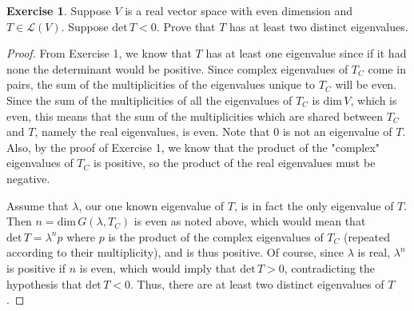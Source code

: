 \documentclass{article}
\theoremstyle{definition}
\newtheorem{ex}{Exercise}
\begin{document}
\begin{ex}
	Suppose $V$ is a real vector space with even dimension and $T \in \mathcal{L}(V)$.
	Suppose $\mathrm{det}\,T < 0$.
	Prove that $T$ has at least two distinct eigenvalues.
\end{ex}
\begin{proof}
	From Exercise 1, we know that $T$ has at least one eigenvalue since if it had none the determinant would be positive.
	Since complex eigenvalues of $T_C$ come in pairs, the sum of the multiplicities of the eigenvalues unique to $T_C$ will be even.
	Since the sum of the multiplicities of all the eigenvalues of $T_C$ is $\mathrm{dim}\,V$, which is even, this means that the sum of the multiplicities which are shared between $T_C$ and $T$, namely the real eigenvalues, is even.
	Note that 0 is not an eigenvalue of $T$.
	Also, by the proof of Exercise 1, we know that the product of the "complex" eigenvalues of $T_C$ is positive, so the product of the real eigenvalues must be negative.

	Assume that $\lambda$, our one known eigenvalue of $T$, is in fact the only eigenvalue of $T$.
	Then $n = \mathrm{dim}\,G(\lambda, T_C)$ is even as noted above, which would mean that $\mathrm{det}\,T = \lambda^np$ where $p$ is the product of the complex eigenvalues of $T_C$ (repeated according to their multiplicity), and is thus positive.
	Of course, since $\lambda$ is real, $\lambda^n$ is positive if $n$ is even, which would imply that $\mathrm{det}\,T > 0$, contradicting the hypothesis that $\mathrm{det}\,T < 0$.
	Thus, there are at least two distinct eigenvalues of $T$.
\end{proof}
\end{document}

